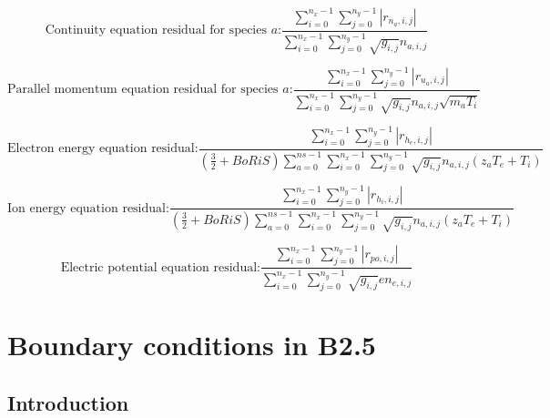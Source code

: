 \documentclass[a4paper,10pt]{report}
\begin{document}
\begin{equation}
\mbox{Continuity equation residual for species } a \mbox{:}
\frac{
	\sum \limits_{i=0}^{n_x-1} \sum \limits_{j=0}^{n_y-1} \left| r_{n_a,i,j} \right|
}{
	\sum \limits_{i=0}^{n_x-1} \sum \limits_{j=0}^{n_y-1} \sqrt{g_{i,j}} n_{a,i,j}
}
\end{equation}

\begin{equation}
\mbox{Parallel momentum equation residual for species } a \mbox{:}
\frac{
	\sum \limits_{i=0}^{n_x-1} \sum \limits_{j=0}^{n_y-1} \left| r_{u_a,i,j} \right|
}{
	\sum \limits_{i=0}^{n_x-1} \sum \limits_{j=0}^{n_y-1} \sqrt{g_{i,j}} n_{a,i,j} \sqrt{m_a T_i}
}
\end{equation}

\begin{equation}
\mbox{Electron energy equation residual:}
\frac{
	\sum \limits_{i=0}^{n_x-1} \sum \limits_{j=0}^{n_y-1} \left| r_{h_e,i,j} \right|
}{
	\left( \frac{3}{2} + BoRiS \right) \sum \limits_{a=0}^{ns-1} \sum \limits_{i=0}^{n_x-1} \sum \limits_{j=0}^{n_y-1} \sqrt{g_{i,j}} n_{a,i,j}
	\left( z_a T_e + T_i \right)
}
\end{equation}

\begin{equation}
\mbox{Ion energy equation residual:}
\frac{
	\sum \limits_{i=0}^{n_x-1} \sum \limits_{j=0}^{n_y-1} \left| r_{h_i,i,j} \right|
}{
	\left( \frac{3}{2} + BoRiS \right) \sum \limits_{a=0}^{ns-1} \sum \limits_{i=0}^{n_x-1} \sum \limits_{j=0}^{n_y-1} \sqrt{g_{i,j}} n_{a,i,j}
	\left( z_a T_e + T_i \right)
}
\end{equation}

\begin{equation}
\mbox{Electric potential equation residual:}
\frac{
	\sum \limits_{i=0}^{n_x-1} \sum \limits_{j=0}^{n_y-1} \left| r_{po,i,j} \right|
}{
	\sum \limits_{i=0}^{n_x-1} \sum \limits_{j=0}^{n_y-1} \sqrt{g_{i,j}} e n_{e,i,j}
}
\end{equation}



\chapter{Boundary conditions in B2.5}
\label{cha:Mladen}

\section{Introduction}
\end{document}
